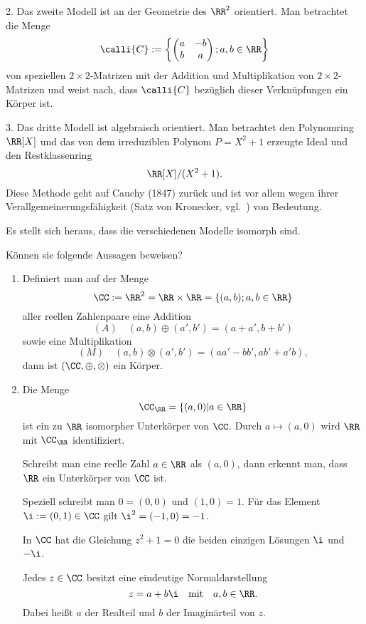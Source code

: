 2. Das zweite Modell ist an der Geometrie des $\RR^2$ orientiert. 
Man betrachtet die Menge 
\[
\calli{C} := \left\{\begin{pmatrix} a &-b \\ b & a \end{pmatrix} ; a,b \in \RR\right\}
\]
von speziellen $2\times 2$-Matrizen mit der Addition und 
Multiplikation von $2\times 2$-Matrizen und weist nach, dass $\calli{C}$ 
bezüglich dieser Verknüpfungen ein Körper ist. 

3. Das dritte Modell ist algebraisch orientiert. Man betrachtet den Polynomring 
$\RR[X]$ und das von dem irreduziblen Polynom $P=X^2+1$ erzeugte Ideal 
und den Restklassenring 
\[
\RR[X] / (X^2+1).
\]
Diese Methode geht auf Cauchy (1847) zurück und ist vor allem wegen ihrer 
Verallgemeinerungsfähigkeit (Satz von Kronecker, vgl.~\citep{Karpfinger}) von Bedeutung.

Es stellt sich heraus, dass die verschiedenen Modelle isomorph sind. 

\begin{frage}
Können sie folgende Aussagen beweisen?

\begin{enumerate}
\item Definiert man auf der Menge 
\[
\CC := \RR^2 = \RR\times \RR = \left\{ (a,b) ; a,b \in \RR \right\}
\]
aller reellen Zahlenpaare eine Addition 
\[
(A)\quad  (a,b) \oplus (a',b') = (a+a',b+b')
\]
sowie eine Multiplikation
\[
(M)\quad (a,b) \otimes (a',b') = (aa'-bb', ab'+a'b),
\]
dann ist $(\CC,\oplus, \otimes)$ ein Körper.   

\item Die Menge 
\[
\CC_{\RR} = \left\{ (a,0) | a\in\RR \right\}
\]
ist ein zu $\RR$ isomorpher Unterkörper von $\CC$. 
Durch $a\mapsto (a,0)$ wird $\RR$ mit $\CC_{\RR}$ identifiziert.

Schreibt man eine reelle Zahl $a\in\RR$ als $(a,0)$, dann erkennt man, dass 
$\RR$ ein Unterkörper von $\CC$ ist. 

Speziell schreibt man $0=(0,0)$ und $(1,0)=1$. Für das Element 
$\i:=(0,1)\in\CC$ gilt $\i^2 = (-1,0) = -1$.

In $\CC$ hat die Gleichung $z^2 +1=0$ die beiden einzigen Lösungen $\i$ und $-\i$. 

Jedes $z\in\CC$ besitzt eine eindeutige Normaldarstellung 
\[
z = a+b\i \quad\text{mit}\quad a,b\in\RR.
\]
Dabei heißt $a$ der Realteil und $b$ der Imaginärteil von $z$.
\end{enumerate}
\end{frage}

